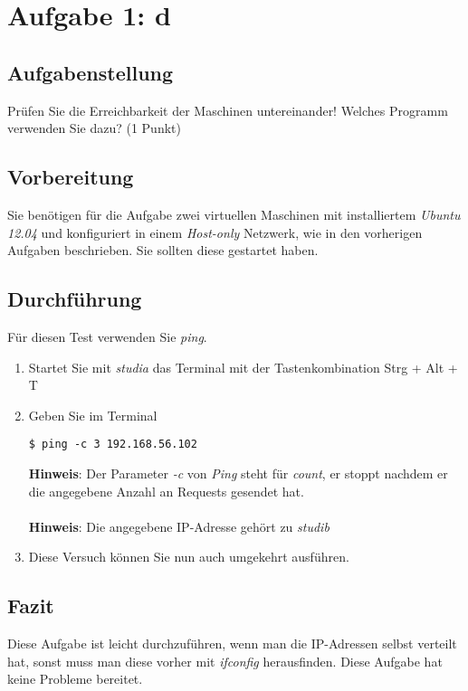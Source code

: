 \newpage

\section{Aufgabe 1: d}

\subsection{Aufgabenstellung}
Prüfen Sie die Erreichbarkeit der Maschinen untereinander! Welches Programm verwenden Sie dazu? (1 Punkt)

\subsection{Vorbereitung}
Sie benötigen für die Aufgabe zwei virtuellen Maschinen mit installiertem \textit{Ubuntu 12.04} und konfiguriert in einem \textit{Host-only} Netzwerk, wie in den vorherigen Aufgaben beschrieben. Sie sollten diese gestartet haben.

\subsection{Durchführung}
Für diesen Test verwenden Sie \textit{ping}.

\begin{enumerate}
	\item Startet Sie mit \textit{studia} das Terminal mit der Tastenkombination Strg + Alt + T
	\item Geben Sie im Terminal \\
	\begin{lstlisting}
$ ping -c 3 192.168.56.102
	\end{lstlisting}
	\textbf{Hinweis}: Der Parameter \textit{-c} von \textit{Ping} steht für \textit{count}, er stoppt nachdem er die angegebene Anzahl an Requests gesendet hat. \\\\
	\textbf{Hinweis}: Die angegebene IP-Adresse gehört zu \textit{studib}
	\item Diese Versuch können Sie nun auch umgekehrt ausführen.
\end{enumerate}

\subsection{Fazit}
Diese Aufgabe ist leicht durchzuführen, wenn man die IP-Adressen selbst verteilt hat, sonst muss man diese vorher mit \textit{ifconfig} herausfinden. Diese Aufgabe hat keine Probleme bereitet.


